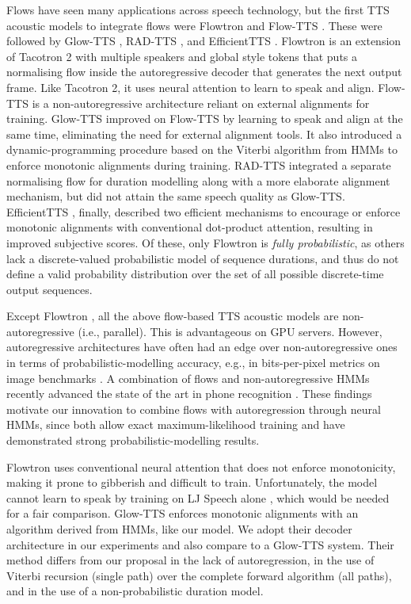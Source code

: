 \documentclass[british]{INTERSPEECH2023_arxiv}
\begin{document}
Flows have seen many applications across speech technology, but the first TTS acoustic models to integrate flows were Flowtron \cite{valle2021flowtron} and Flow-TTS \cite{miao2020flow}.
These were followed by Glow-TTS \cite{kim2020glow}, RAD-TTS \cite{shih2021rad}, and EfficientTTS \cite{miao2021efficienttts}.
Flowtron is an extension of Tacotron 2 with multiple speakers and global style tokens \cite{wang2018style} that puts a normalising flow inside the autoregressive decoder that generates the next output frame.
Like Tacotron 2, it uses neural attention to learn to speak and align.
Flow-TTS is a non-autoregressive architecture reliant on external alignments for training.
Glow-TTS improved on Flow-TTS by learning to speak and align at the same time, eliminating the need for external alignment tools.
It also introduced a dynamic-programming procedure based on the Viterbi algorithm from HMMs to enforce monotonic alignments during training.
RAD-TTS \cite{shih2021rad} integrated a separate normalising flow for duration modelling along with a more elaborate alignment mechanism, but did not attain the same speech quality as Glow-TTS.
EfficientTTS \cite{miao2021efficienttts}, finally, described two efficient mechanisms to encourage or enforce monotonic alignments with conventional dot-product attention, 
resulting in improved subjective scores.
\label{fully_prob_def}
Of these, only Flowtron is \emph{fully probabilistic}, as others lack a discrete-valued probabilistic model of sequence durations, and thus do not define a valid probability distribution over the set of all possible discrete-time output sequences.


Except Flowtron \cite{valle2021flowtron}, all the above flow-based TTS acoustic models are non-autoregressive (i.e., parallel).
This is advantageous on GPU servers.
However, autoregressive architectures have often had an edge over non-autoregressive ones in terms of probabilistic-modelling accuracy, e.g., in bits-per-pixel metrics on image benchmarks \cite{kingma2021variational}.
A combination of flows and non-autoregressive HMMs recently advanced the state of the art in phone recognition \cite{ghosh2020robust,ghosh2021normalizing}.
These findings motivate our innovation to combine flows with autoregression through neural HMMs, since both allow exact maximum-likelihood training and have demonstrated strong probabilistic-modelling results.

Flowtron \cite{valle2021flowtron} uses conventional neural attention that does not enforce monotonicity, making it prone to gibberish and difficult to train.
Unfortunately, the model cannot learn to speak by training on LJ Speech alone \cite{valle2021flowtron}, which would be needed for a fair comparison.
Glow-TTS \cite{kim2020glow} enforces monotonic alignments with an algorithm derived from HMMs, like our model.
We adopt their decoder architecture in our experiments and also compare to a Glow-TTS system.
Their method differs from our proposal in the lack of autoregression, in the use of Viterbi recursion (single path) over the complete forward algorithm (all paths), and in the use of a non-probabilistic duration model. 
\end{document}
